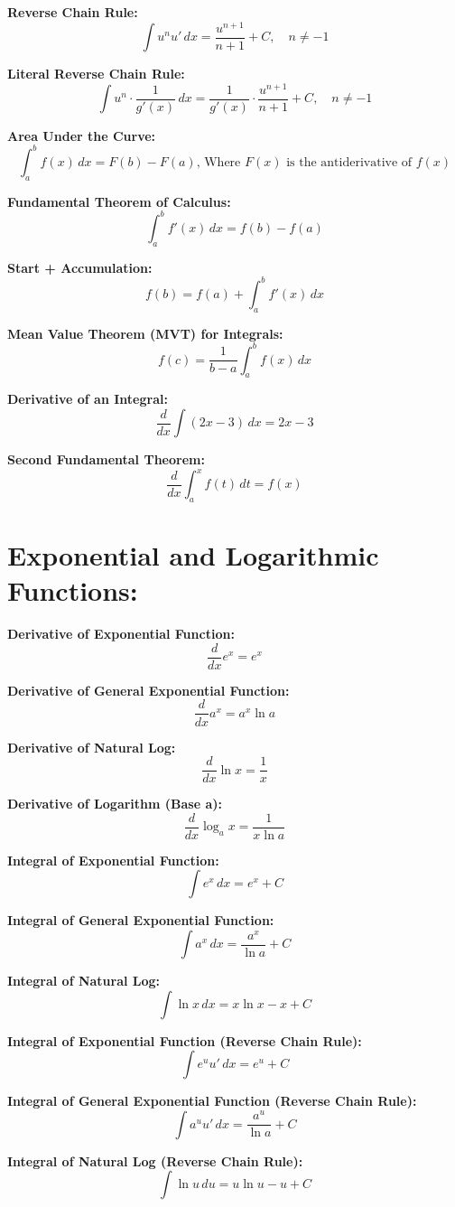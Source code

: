 \documentclass{article}
\begin{document}
\textbf{Reverse Chain Rule:}
\[
\int u^n u' \, dx = \frac{u^{n+1}}{n+1} + C, \quad n \neq -1
\]

\textbf{Literal Reverse Chain Rule:}
\[
\int u^n \cdot \frac{1}{g{\prime}(x)} \, dx = \frac{1}{g{\prime}(x)} \cdot \frac{u^{n + 1}}{n + 1} + C, \quad n \neq -1
\]

\textbf{Area Under the Curve:}
\[
\int_{a}^{b} f(x) \, dx = F(b) - F(a) \text{, Where } F(x) \text{ is the antiderivative of } f(x)
\]

\textbf{Fundamental Theorem of Calculus:}
\[
\int_{a}^{b} f'(x) \, dx = f(b) - f(a)
\]

\textbf{Start + Accumulation:}
\[
f(b) = f(a) + \int_{a}^{b} f'(x) \, dx
\]

\textbf{Mean Value Theorem (MVT) for Integrals:}
\[
f(c) = \frac{1}{b - a} \int_{a}^{b} f(x) \, dx
\]

\textbf{Derivative of an Integral:}
\[
\frac{d}{dx} \int (2x-3)\, dx = 2x-3
\]

\textbf{Second Fundamental Theorem:}
\[
\frac{d}{dx} \int_{a}^{x} f(t) \, dt = f(x)
\]

\section*{\textbf{Exponential and Logarithmic Functions:}}

\textbf{Derivative of Exponential Function:}
\[
\frac{d}{dx} e^x = e^x
\]

\textbf{Derivative of General Exponential Function:}
\[
\frac{d}{dx} a^x = a^x \ln a
\]

\textbf{Derivative of Natural Log:}
\[
\frac{d}{dx} \ln x = \frac{1}{x}
\]

\textbf{Derivative of Logarithm (Base a):}
\[
\frac{d}{dx} \log_a x = \frac{1}{x \ln a}
\]

\textbf{Integral of Exponential Function:}
\[
\int e^x \, dx = e^x + C
\]

\textbf{Integral of General Exponential Function:}
\[
\int a^x \, dx = \frac{a^x}{\ln a} + C
\]

\textbf{Integral of Natural Log:}
\[
\int \ln x \, dx = x \ln x - x + C
\]

\textbf{Integral of Exponential Function (Reverse Chain Rule):}
\[
\int e^{u} u' \, dx = e^{u} + C
\]

\textbf{Integral of General Exponential Function (Reverse Chain Rule):}
\[
\int a^{u} u' \, dx = \frac{a^{u}}{\ln a} + C
\]

\textbf{Integral of Natural Log (Reverse Chain Rule):}
\[
\int \ln u \, du = u \ln u - u + C
\]
\end{document}
